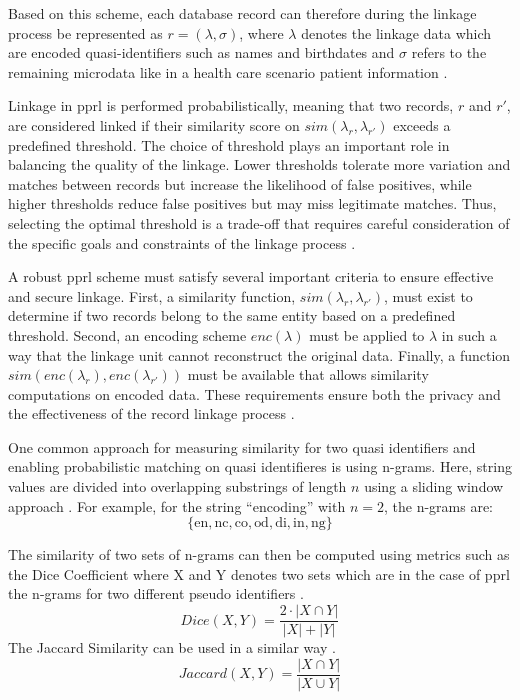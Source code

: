 Based on this scheme, each database record can therefore during the linkage process be represented as $r = (\lambda,  \sigma)$, where $\lambda$ denotes the linkage data which are encoded quasi-identifiers such as names and birthdates and $\sigma$ refers to the remaining microdata like in a health care scenario patient information \cite{schaefer2024}.

Linkage in \ac{pprl} is performed probabilistically, meaning that two records, \(r\) and \(r'\), are considered linked if their similarity score on \(sim(\lambda_r, \lambda_{r'})\) exceeds a predefined threshold.
The choice of threshold plays an important role in balancing the quality of the linkage.
Lower thresholds tolerate more variation and matches between records but increase the likelihood of false positives, while higher thresholds reduce false positives but may miss legitimate matches.
Thus, selecting the optimal threshold is a trade-off that requires careful consideration of the specific goals and constraints of the linkage process \cite{schaefer2024}.

A robust \ac{pprl} scheme must satisfy several important criteria to ensure effective and secure linkage.
First, a similarity function, \(sim(\lambda_r, \lambda_{r'})\), must exist to determine if two records belong to the same entity based on a predefined threshold.
Second, an encoding scheme \(enc(\lambda)\)  must be applied to \(\lambda\) in such a way that the linkage unit cannot reconstruct the original data.
Finally, a function \(sim(enc(\lambda_r), enc(\lambda_{r'}))\) must be available that allows similarity computations on encoded data.
These requirements ensure both the privacy and the effectiveness of the record linkage process \cite{schaefer2024}.

One common approach for measuring similarity for two quasi identifiers and enabling probabilistic matching on quasi identifieres is using n-grams.
Here, string values are divided into overlapping substrings of length $n$ using a sliding window approach \cite{schaefer2024}.
For example, for the string ``encoding'' with $n=2$, the n-grams are:
$$ \{\text{en}, \text{nc}, \text{co}, \text{od}, \text{di}, \text{in}, \text{ng} \} $$

The similarity of two sets of n-grams can then be computed using metrics such as the Dice Coefficient where X and Y denotes two sets which are in the case of \ac{pprl} the n-grams for two different pseudo identifiers \cite{schaefer2024}.
  $$ Dice(X, Y) = \frac{2 \cdot |X \cap Y|}{|X| + |Y|} $$
The Jaccard Similarity can be used in a similar way \cite{schaefer2024}.
  $$ Jaccard(X, Y) = \frac{|X \cap Y|}{|X \cup Y|} $$

